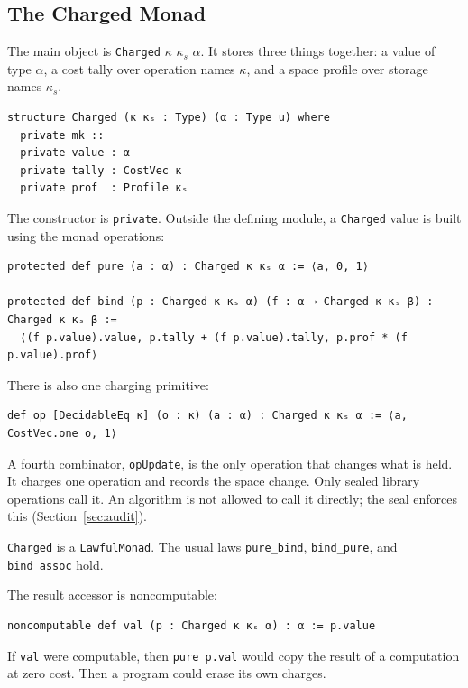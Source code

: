 \documentclass[acmsmall,nonacm]{acmart}
\begin{document}
\subsection{The Charged Monad}\label{sec:charged}

The main object is \lstinline{Charged} $\kappa$ $\kappa_s$ $\alpha$.
It stores three things together: a value of type $\alpha$, a cost tally over operation names $\kappa$, and a space profile over storage names $\kappa_s$.

\begin{lstlisting}
structure Charged (κ κₛ : Type) (α : Type u) where
  private mk ::
  private value : α
  private tally : CostVec κ
  private prof  : Profile κₛ
\end{lstlisting}

The constructor is \lstinline{private}.
Outside the defining module, a \lstinline{Charged} value is built using the monad operations:

\begin{lstlisting}
protected def pure (a : α) : Charged κ κₛ α := ⟨a, 0, 1⟩

protected def bind (p : Charged κ κₛ α) (f : α → Charged κ κₛ β) : Charged κ κₛ β :=
  ⟨(f p.value).value, p.tally + (f p.value).tally, p.prof * (f p.value).prof⟩
\end{lstlisting}

There is also one charging primitive:

\begin{lstlisting}
def op [DecidableEq κ] (o : κ) (a : α) : Charged κ κₛ α := ⟨a, CostVec.one o, 1⟩
\end{lstlisting}

A fourth combinator, \lstinline{opUpdate}, is the only operation that changes what is held.
It charges one operation and records the space change.
Only sealed library operations call it.
An algorithm is not allowed to call it directly; the seal enforces this (Section~\ref{sec:audit}).

\lstinline{Charged} is a \lstinline{LawfulMonad}.
The usual laws \lstinline{pure_bind}, \lstinline{bind_pure}, and \lstinline{bind_assoc} hold.

The result accessor is noncomputable:

\begin{lstlisting}
noncomputable def val (p : Charged κ κₛ α) : α := p.value
\end{lstlisting}

If \lstinline{val} were computable, then \lstinline{pure p.val} would copy the result of a computation at zero cost.
Then a program could erase its own charges.
\end{document}
